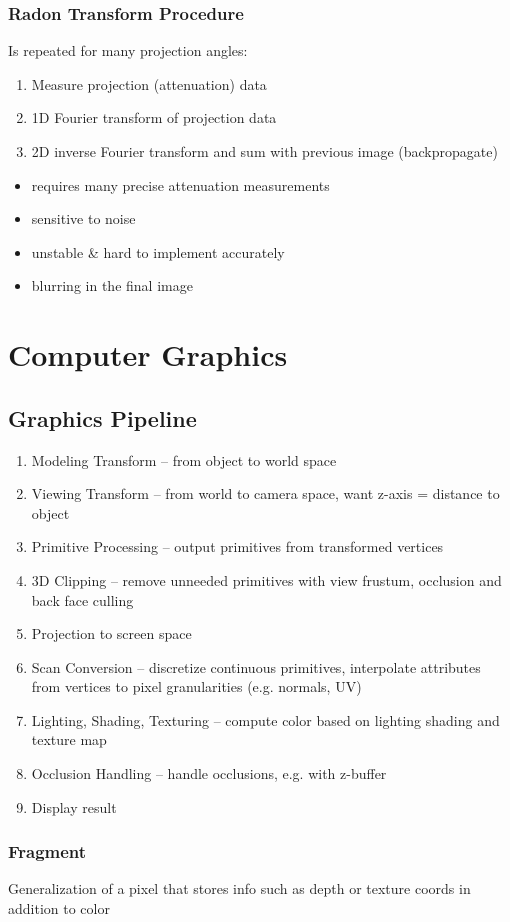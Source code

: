 \documentclass[a4paper,10pt]{article}
\newcommand*\bad{\item[\textcolor{badred}{\(\bm{-}\)}]}
\begin{document}
\subsubsection{Radon Transform Procedure}
Is repeated for many projection angles:
\begin{enumerate}
    \item Measure projection (attenuation) data
    \item 1D Fourier transform of projection data
    \item 2D inverse Fourier transform and sum with previous image (backpropagate)
\end{enumerate}
\begin{itemize}
    \bad requires many precise attenuation measurements
    \bad sensitive to noise
    \bad unstable \& hard to implement accurately
    \bad blurring in the final image
\end{itemize}

\section{Computer Graphics}
\subsection{Graphics Pipeline}
\begin{enumerate}
    \item Modeling Transform -- from object to world space
    \item Viewing Transform -- from world to camera space, want z-axis = distance to object
    \item Primitive Processing -- output primitives from transformed vertices
    \item 3D Clipping -- remove unneeded primitives with view frustum, occlusion and back face culling
    \item Projection to screen space
    \item Scan Conversion -- discretize continuous primitives, interpolate attributes from vertices to pixel granularities (e.g. normals, UV)
    \item Lighting, Shading, Texturing -- compute color based on lighting shading and texture map
    \item Occlusion Handling -- handle occlusions, e.g. with z-buffer
    \item Display result
\end{enumerate}

\subsubsection{Fragment} Generalization of a pixel that stores info such as depth or texture coords in addition to color
\end{document}
